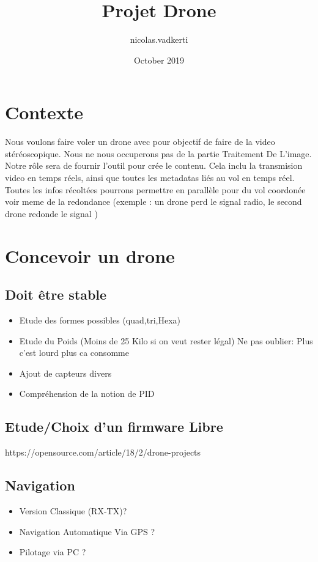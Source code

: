 \documentclass{article}
\title{Projet Drone}
\author{nicolas.vadkerti }
\date{October 2019}
\begin{document}
\maketitle
\section{Contexte}
Nous voulons faire voler un drone avec pour objectif de faire de la video stéréoscopique. Nous ne nous occuperons pas de la partie Traitement De L'image. Notre rôle sera de fournir l'outil pour crée le contenu. Cela inclu la transmision video en temps réels, ainsi que toutes les metadatas liés au vol en temps réel. Toutes les infos récoltées pourrons permettre en parallèle pour du vol coordonée voir meme de la redondance (exemple : un drone perd le signal radio, le second drone redonde le signal )  

\section{Concevoir un drone}
\subsection{Doit être stable}
\begin{itemize}
    \item Etude des formes possibles (quad,tri,Hexa)
    \item Etude du Poids (Moins de 25 Kilo si on veut rester légal) Ne pas oublier: Plus c'est lourd plus ca consomme 
    \item Ajout de capteurs divers 
    \item Compréhension de la notion de PID
\end{itemize}
\subsection{Etude/Choix d'un firmware Libre} https://opensource.com/article/18/2/drone-projects
\subsection{Navigation}
\begin{itemize}
    \item Version Classique (RX-TX)?
    \item Navigation Automatique Via GPS ?
    \item Pilotage via PC ? 
\end{itemize}
\end{document}
